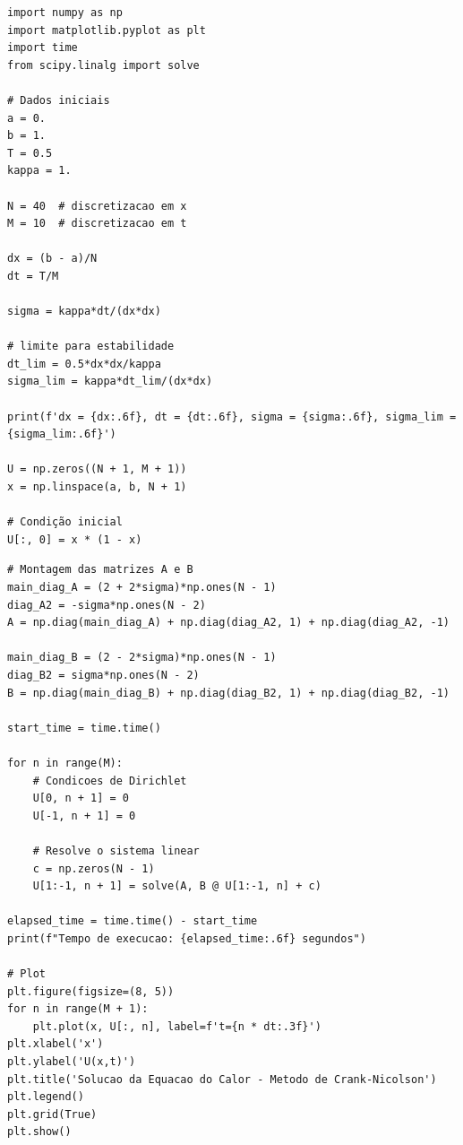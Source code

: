 \documentclass[../differential_methods.tex]{subfiles}
\begin{document}
\begin{listing}[H]
	\caption{Implementação de Crank-Nicolson}
	\begin{verbatim}
import numpy as np
import matplotlib.pyplot as plt
import time
from scipy.linalg import solve

# Dados iniciais
a = 0.
b = 1.
T = 0.5
kappa = 1.

N = 40  # discretizacao em x
M = 10  # discretizacao em t

dx = (b - a)/N
dt = T/M

sigma = kappa*dt/(dx*dx)

# limite para estabilidade
dt_lim = 0.5*dx*dx/kappa
sigma_lim = kappa*dt_lim/(dx*dx)

print(f'dx = {dx:.6f}, dt = {dt:.6f}, sigma = {sigma:.6f}, sigma_lim = {sigma_lim:.6f}')

U = np.zeros((N + 1, M + 1))
x = np.linspace(a, b, N + 1)

# Condição inicial
U[:, 0] = x * (1 - x)
\end{verbatim}
\end{listing}
\pagebreak
\begin{verbatim}
# Montagem das matrizes A e B
main_diag_A = (2 + 2*sigma)*np.ones(N - 1)
diag_A2 = -sigma*np.ones(N - 2)
A = np.diag(main_diag_A) + np.diag(diag_A2, 1) + np.diag(diag_A2, -1)

main_diag_B = (2 - 2*sigma)*np.ones(N - 1)
diag_B2 = sigma*np.ones(N - 2)
B = np.diag(main_diag_B) + np.diag(diag_B2, 1) + np.diag(diag_B2, -1)

start_time = time.time()

for n in range(M):
    # Condicoes de Dirichlet
    U[0, n + 1] = 0
    U[-1, n + 1] = 0

    # Resolve o sistema linear
    c = np.zeros(N - 1)
    U[1:-1, n + 1] = solve(A, B @ U[1:-1, n] + c)

elapsed_time = time.time() - start_time
print(f"Tempo de execucao: {elapsed_time:.6f} segundos")

# Plot
plt.figure(figsize=(8, 5))
for n in range(M + 1):
    plt.plot(x, U[:, n], label=f't={n * dt:.3f}')
plt.xlabel('x')
plt.ylabel('U(x,t)')
plt.title('Solucao da Equacao do Calor - Metodo de Crank-Nicolson')
plt.legend()
plt.grid(True)
plt.show()
\end{verbatim}
\end{document}
